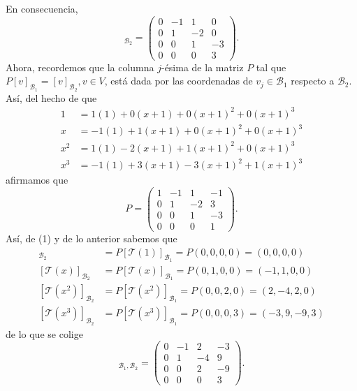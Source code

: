 \documentclass[11pt]{scrartcl}
\begin{document}
En consecuencia,
\begin{equation*}
    [T]_{\mathcal{B}_2} =
    \begin{pmatrix}
        0 & -1 & 1 & 0 \\
        0 & 1 & -2 & 0 \\
        0 & 0 & 1 & -3 \\
        0 & 0 & 0 & 3
    \end{pmatrix}.
\end{equation*}
Ahora, recordemos que la columna $j$-ésima de la matriz
$P$ tal que $P[v]_{\mathcal{B}_1}=[v]_{\mathcal{B}_2}, v \in V$, está dada por las coordenadas de $v_j \in \mathcal{B}_1$
respecto a $\mathcal{B}_2$. Así, del hecho de que
\begin{align*}
    1 &= 1(1) + 0(x+1) + 0(x+1)^2 + 0(x+1)^3 \\
    x &= -1(1) + 1(x+1) + 0(x+1)^2 + 0(x+1)^3 \\
    x^2 &= 1(1) - 2(x+1) + 1(x+1)^2 + 0(x+1)^3 \\
    x^3 &= -1(1) + 3(x+1) - 3(x+1)^2 + 1(x+1)^3
\end{align*}
afirmamos que
\begin{equation*}
    P=
    \begin{pmatrix}
        1 & -1 & 1 & -1 \\
        0 & 1 & -2 & 3 \\
        0 & 0 & 1 & -3 \\
        0 & 0 & 0 & 1
    \end{pmatrix}.
\end{equation*}
Así, de (1) y de lo anterior sabemos que
\begin{align*}
    [\mathcal{T}(1)]_{\mathcal{B}_2} &= P[\mathcal{T}(1)]_{\mathcal{B}_1}= P(0,0,0,0) = (0,0,0,0) \\
    [\mathcal{T}\left(x\right)]_{\mathcal{B}_2} &= P[\mathcal{T}\left(x\right)]_{\mathcal{B}_1}= P(0,1,0,0) = (-1,1,0,0) \\
    [\mathcal{T}\left(x^2\right)]_{\mathcal{B}_2} &= P[\mathcal{T}\left(x^2\right)]_{\mathcal{B}_1}= P(0,0,2,0) = (2,-4,2,0) \\
    [\mathcal{T}\left(x^3\right)]_{\mathcal{B}_2} &= P[\mathcal{T}\left(x^3\right)]_{\mathcal{B}_1}= P(0,0,0,3) = (-3,9,-9,3)
\end{align*}
de lo que se colige
\begin{equation*}
    [T]_{\mathcal{B}_1,\mathcal{B}_2} =
    \begin{pmatrix}
        0 & -1 & 2 & -3 \\
        0 & 1 & -4 & 9 \\
        0 & 0 & 2 & -9 \\
        0 & 0 & 0 & 3
    \end{pmatrix}.
\end{equation*}
\end{document}

